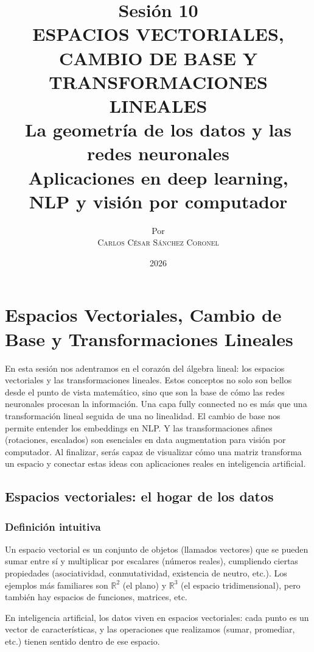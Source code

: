 \documentclass[12pt,a4paper,openany,oneside]{book}
\title{
    \textbf{Sesión 10} \\ 
    \Huge \textbf{ESPACIOS VECTORIALES, CAMBIO DE BASE Y TRANSFORMACIONES LINEALES} \\
    \large La geometría de los datos y las redes neuronales \\
    \normalsize Aplicaciones en deep learning, NLP y visión por computador
}
\author{
    \small Por \\ \vspace{0.2cm}
    \Large \textsc{Carlos César Sánchez Coronel}
}
\date{2026}
\begin{document}
\maketitle
\tableofcontents
{}

\chapter{Espacios Vectoriales, Cambio de Base y Transformaciones Lineales}

En esta sesión nos adentramos en el corazón del álgebra lineal: los espacios vectoriales y las transformaciones lineales. Estos conceptos no solo son bellos desde el punto de vista matemático, sino que son la base de cómo las redes neuronales procesan la información. Una capa fully connected no es más que una transformación lineal seguida de una no linealidad. El cambio de base nos permite entender los embeddings en NLP. Y las transformaciones afines (rotaciones, escalados) son esenciales en data augmentation para visión por computador. Al finalizar, serás capaz de visualizar cómo una matriz transforma un espacio y conectar estas ideas con aplicaciones reales en inteligencia artificial.

\section{Espacios vectoriales: el hogar de los datos}

\subsection{Definición intuitiva}
Un espacio vectorial es un conjunto de objetos (llamados vectores) que se pueden sumar entre sí y multiplicar por escalares (números reales), cumpliendo ciertas propiedades (asociatividad, conmutatividad, existencia de neutro, etc.). Los ejemplos más familiares son $\mathbb{R}^2$ (el plano) y $\mathbb{R}^3$ (el espacio tridimensional), pero también hay espacios de funciones, matrices, etc.

En inteligencia artificial, los datos viven en espacios vectoriales: cada punto es un vector de características, y las operaciones que realizamos (sumar, promediar, etc.) tienen sentido dentro de ese espacio.
\end{document}
